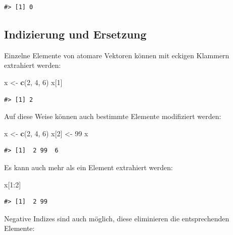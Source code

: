 \documentclass[]{tufte-book}
\newenvironment{Shaded}{}{}
\newcommand{\KeywordTok}[1]{\textcolor[rgb]{0.00,0.44,0.13}{\textbf{#1}}}
\newcommand{\DecValTok}[1]{\textcolor[rgb]{0.25,0.63,0.44}{#1}}
\newcommand{\StringTok}[1]{\textcolor[rgb]{0.25,0.44,0.63}{#1}}
\newcommand{\OperatorTok}[1]{\textcolor[rgb]{0.40,0.40,0.40}{#1}}
\newcommand{\NormalTok}[1]{#1}
\begin{document}
\begin{verbatim}
#> [1] 0
\end{verbatim}

\subsection{Indizierung und Ersetzung}\label{indizierung-und-ersetzung}

Einzelne Elemente von atomare Vektoren können mit eckigen Klammern
extrahiert werden:

\begin{Shaded}
\begin{Highlighting}[]
\NormalTok{x <-}\StringTok{ }\KeywordTok{c}\NormalTok{(}\DecValTok{2}\NormalTok{, }\DecValTok{4}\NormalTok{, }\DecValTok{6}\NormalTok{)}
\NormalTok{x[}\DecValTok{1}\NormalTok{]}
\end{Highlighting}
\end{Shaded}

\begin{verbatim}
#> [1] 2
\end{verbatim}

Auf diese Weise können auch bestimmte Elemente modifiziert werden:

\begin{Shaded}
\begin{Highlighting}[]
\NormalTok{x <-}\StringTok{ }\KeywordTok{c}\NormalTok{(}\DecValTok{2}\NormalTok{, }\DecValTok{4}\NormalTok{, }\DecValTok{6}\NormalTok{)}
\NormalTok{x[}\DecValTok{2}\NormalTok{] <-}\StringTok{ }\DecValTok{99}
\NormalTok{x}
\end{Highlighting}
\end{Shaded}

\begin{verbatim}
#> [1]  2 99  6
\end{verbatim}

Es kann auch mehr als ein Element extrahiert werden:

\begin{Shaded}
\begin{Highlighting}[]
\NormalTok{x[}\DecValTok{1}\OperatorTok{:}\DecValTok{2}\NormalTok{]}
\end{Highlighting}
\end{Shaded}

\begin{verbatim}
#> [1]  2 99
\end{verbatim}

Negative Indizes sind auch möglich, diese eliminieren die entsprechenden
Elemente:
\end{document}

